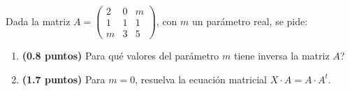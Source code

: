 
Dada la matriz $A=\begin{pmatrix}2&0&m\\1&1&1\\m&3&5\end{pmatrix}$,
con $m$ un parámetro real, se pide:
\begin{enumerate}[label=\alph*)]
\item \textbf{(0.8 puntos)} \textquestiondown{}Para qué valores del parámetro $m$ tiene inversa la matriz $A$?
\item \textbf{(1.7 puntos)} Para $m=0$, resuelva la ecuación matricial $X\cdot A=A\cdot A^t$.
\end{enumerate}
